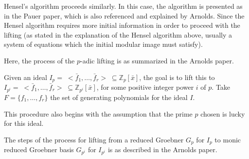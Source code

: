 \documentclass[letterpaper,12pt,titlepage,oneside,final]{book}
\begin{document}
Hensel's algorithm proceeds similarly.  In this case, the algorithm is presented as in the Pauer paper, which is also referenced and explained by Arnolds.  Since the Hensel algorithm requires more initial information in order to proceed with the lifting (as stated in the explanation of the Hensel algorithm above, usually a system of equations which the initial modular image must satisfy).  

Here, the process of the ${p}$-adic lifting is as summarized in the Arnolds paper.  

Given an ideal ${I_{p} = \; <\bar f_1, \ldots, \bar f_r> \; \subseteq \mathbb{Z}_{p}[\bar x]}$, the goal is to lift this to ${I_{p^i} = \; <\bar f_1, \ldots, \bar f_r> \; \subseteq \mathbb{Z}_{p^i}[\bar x]}$, for some positive integer power ${i}$ of ${p}$.  Take ${F = \{f_1, \ldots, f_r\}}$ the set of generating polynomials for the ideal ${I}$.  

This procedure also begins with the assumption that the prime ${p}$ chosen is lucky for this ideal.

The steps of the process for lifting from a reduced Groebner ${G_p}$ for ${I_p}$ to monic reduced Groebner basis ${G_{p^i}}$ for ${I_{p^i}}$ is as described in the Arnolds paper.
\end{document}
